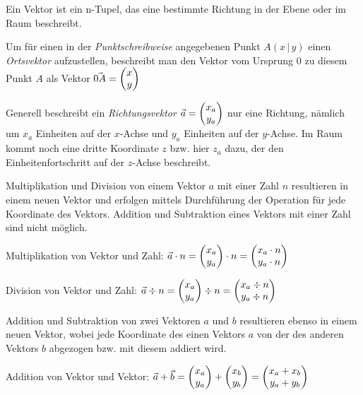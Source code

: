 



\thispagestyle{plain}

Ein Vektor ist ein n-Tupel, das eine bestimmte Richtung in der Ebene oder im Raum beschreibt.


Um f\"{u}r einen in der \emph{Punktschreibweise} angegebenen Punkt $A (x\, |\, y)$ einen \emph{Ortsvektor} aufzustellen, beschreibt man den Vektor vom Ursprung $0$ zu diesem Punkt $A$ als Vektor $\vec{0A} = \begin{pmatrix}x\\y\end{pmatrix}$

Generell beschreibt ein \emph{Richtungsvektor} $\vec{a} = \begin{pmatrix}x_{a} \\ y_{a}\end{pmatrix}$ nur eine Richtung, n\"{a}mlich um $x_{a}$ Einheiten auf der $x$-Achse und $y_{a}$ Einheiten auf der $y$-Achse. Im Raum kommt noch eine dritte Koordinate $z$ bzw. hier $z_{a}$ dazu, der den Einheitenfortschritt auf der $z$-Achse beschreibt.



Multiplikation und Division von einem Vektor $a$ mit einer Zahl $n$ resultieren in einem neuen Vektor und erfolgen mittels Durchf\"{u}hrung der Operation f\"{u}r jede Koordinate des Vektors. Addition und Subtraktion eines Vektors mit einer Zahl sind nicht m\"{o}glich.

Multiplikation von Vektor und Zahl: $ \vec{a} \cdot n = \begin{pmatrix}x_{a}\\y_{a}\end{pmatrix} \cdot n  = \begin{pmatrix}x_{a} \cdot n \\ y_{a} \cdot n\end{pmatrix}$

Division von Vektor und Zahl: $ \vec{a} \div n = \begin{pmatrix}x_{a}\\y_{a}\end{pmatrix} \div n = \begin{pmatrix}x_{a} \div n \\ y_{a} \div n\end{pmatrix}$


Addition und Subtraktion von zwei Vektoren $a$ und $b$ resultieren ebenso in einem neuen Vektor, wobei jede Koordinate des einen Vektors $a$ von der des anderen Vektors $b$ abgezogen bzw. mit diesem addiert wird.

Addition von Vektor und Vektor: $\vec{a} + \vec{b} = \begin{pmatrix}x_{a}\\y_{a}\end{pmatrix} + \begin{pmatrix}x_{b}\\y_{b}\end{pmatrix} = \begin{pmatrix}x_{a} + x_{b} \\ y_{a} + y_{b}\end{pmatrix}$

